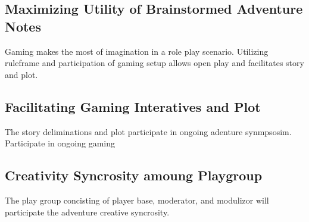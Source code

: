 \documentclass{article}
\begin{document}
\subsection{Maximizing Utility of Brainstormed Adventure Notes}
Gaming makes the most of imagination in a role play scenario. Utilizing ruleframe and participation of gaming setup allows open play and facilitates story and plot. 

\subsection*{Facilitating Gaming Interatives and Plot}
The story deliminations and plot participate in ongoing adenture synmpsosim.
Participate in ongoing gaming

\subsection*{Creativity Syncrosity amoung Playgroup}
The play group concisting of player base, moderator, and modulizor will participate the adventure creative syncrosity.
\end{document}
